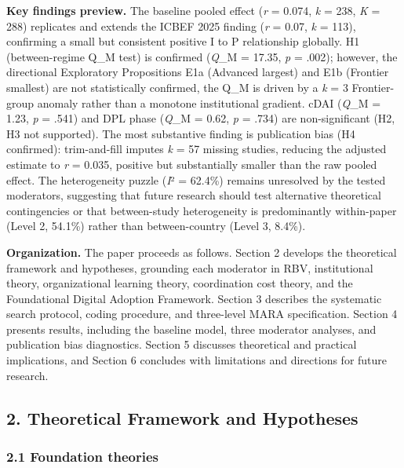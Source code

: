 \documentclass[
  12pt,a4paper]{article}
\begin{document}
\textbf{Key findings preview.} The baseline pooled effect (\emph{r} =
0.074, \emph{k} = 238, \emph{K} = 288) replicates and extends the ICBEF
2025 finding (\emph{r} = 0.07, \emph{k} = 113), confirming a small but
consistent positive I to P relationship globally. H1 (between-regime
Q\_M test) is confirmed (\emph{Q}\_M = 17.35, \emph{p} = .002); however,
the directional Exploratory Propositions E1a (Advanced largest) and E1b
(Frontier smallest) are not statistically confirmed, the Q\_M is driven
by a \emph{k} = 3 Frontier-group anomaly rather than a monotone
institutional gradient. cDAI (\emph{Q}\_M = 1.23, \emph{p} = .541) and
DPL phase (\emph{Q}\_M = 0.62, \emph{p} = .734) are non-significant (H2,
H3 not supported). The most substantive finding is publication bias (H4
confirmed): trim-and-fill imputes \emph{k} = 57 missing studies,
reducing the adjusted estimate to \emph{r} = 0.035, positive but
substantially smaller than the raw pooled effect. The heterogeneity
puzzle (\emph{I}² = 62.4\%) remains unresolved by the tested moderators,
suggesting that future research should test alternative theoretical
contingencies or that between-study heterogeneity is predominantly
within-paper (Level 2, 54.1\%) rather than between-country (Level 3,
8.4\%).

\textbf{Organization.} The paper proceeds as follows. Section 2 develops
the theoretical framework and hypotheses, grounding each moderator in
RBV, institutional theory, organizational learning theory, coordination
cost theory, and the Foundational Digital Adoption Framework. Section 3
describes the systematic search protocol, coding procedure, and
three-level MARA specification. Section 4 presents results, including
the baseline model, three moderator analyses, and publication bias
diagnostics. Section 5 discusses theoretical and practical implications,
and Section 6 concludes with limitations and directions for future
research.

\hypertarget{theoretical-framework-and-hypotheses}{%
\subsection{2. Theoretical Framework and
Hypotheses}\label{theoretical-framework-and-hypotheses}}

\hypertarget{foundation-theories}{%
\subsubsection{2.1 Foundation theories}\label{foundation-theories}}
\end{document}
